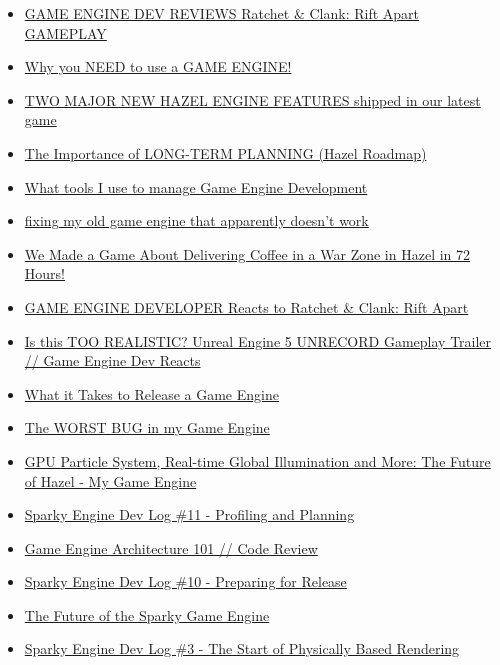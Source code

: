 \begin{itemize}
\item
  \href{https://www.youtube.com/watch?v=d5_9EEfN-Mw}{GAME ENGINE DEV REVIEWS Ratchet \& Clank: Rift Apart GAMEPLAY}
\item
  \href{https://www.youtube.com/watch?v=QQ9MTzrsldo}{Why you NEED to use a GAME ENGINE!}
\item
  \href{https://www.youtube.com/watch?v=VjlKwQoKluI}{TWO MAJOR NEW HAZEL ENGINE FEATURES shipped in our latest game}
\item
  \href{https://www.youtube.com/watch?v=OsnwKYxPX1A}{The Importance of LONG-TERM PLANNING (Hazel Roadmap)}
\item
  \href{https://www.youtube.com/watch?v=XGYEk9rbGjU}{What tools I use to manage Game Engine Development}
\item
  \href{https://www.youtube.com/watch?v=kucQm2pWYeU}{fixing my old game engine that apparently doesn't work}
\item
  \href{https://www.youtube.com/watch?v=ahrdtYwBLTk}{We Made a Game About Delivering Coffee in a War Zone in Hazel in 72 Hours!}
\item
  \href{https://www.youtube.com/watch?v=qCSyy5BTDuc}{GAME ENGINE DEVELOPER Reacts to Ratchet \& Clank: Rift Apart}
\item
  \href{https://www.youtube.com/watch?v=p4aAMPtNIsQ}{Is this TOO REALISTIC? Unreal Engine 5 UNRECORD Gameplay Trailer // Game Engine Dev Reacts}
\item
  \href{https://www.youtube.com/watch?v=wv6KQWrV4KA}{What it Takes to Release a Game Engine}
\item
  \href{https://www.youtube.com/watch?v=x5dy8T9dRPk}{The WORST BUG in my Game Engine}
\item
  \href{https://www.youtube.com/watch?v=hUFHzuIyK0g}{GPU Particle System, Real-time Global Illumination and More: The Future of Hazel - My Game Engine}
\item
  \href{https://www.youtube.com/watch?v=cimYa67cR-U}{Sparky Engine Dev Log \#11 - Profiling and Planning}
\item
  \href{https://www.youtube.com/watch?v=Tz3rnKVOGv8}{Game Engine Architecture 101 // Code Review}
\item
  \href{https://www.youtube.com/watch?v=bTAiINeDyUA}{Sparky Engine Dev Log \#10 - Preparing for Release}
\item
  \href{https://www.youtube.com/watch?v=0IGLWhLgxns}{The Future of the Sparky Game Engine}
\item
  \href{https://www.youtube.com/watch?v=YRd2F1JDGlg}{Sparky Engine Dev Log \#3 - The Start of Physically Based Rendering}

\end{itemize}
